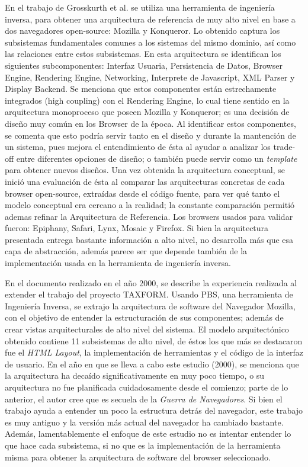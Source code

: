 En el trabajo de Grosskurth et al. \cite{2005-grosskurth-browser-refarch, preprint-grosskurth-browser-archevol} se utiliza una herramienta de ingeniería inversa, para obtener una arquitectura de referencia de muy alto nivel en base a dos navegadores open-source: Mozilla y Konqueror. Lo obtenido captura los subsistemas fundamentales comunes a los sistemas del mismo dominio, así como las relaciones entre estos subsistemas. En esta arquitectura se identifican los siguientes subcomponentes: Interfaz Usuaria, Persistencia de Datos, Browser Engine, Rendering Engine, Networking, Interprete de Javascript, XML Parser y Display Backend. Se menciona que estos componentes están estrechamente integrados (high coupling) con el Rendering Engine, lo cual tiene sentido en la arquitectura monoproceso que poseen Mozilla y Konqueror; es una decisión de diseño muy común en los Browser de la época. Al identificar estos componentes, se comenta que esto podría servir tanto en el diseño y durante la mantención de un sistema, pues mejora el entendimiento de ésta al ayudar a analizar los trade-off entre diferentes opciones de diseño; o también puede servir como un \textit{template} para obtener nuevos diseños. Una vez obtenida la arquitectura conceptual, se inició una evaluación de ésta al comparar las arquitecturas concretas de cada browser open-source, extraídas desde el código fuente, para ver qué tanto el modelo conceptual era cercano a la realidad; la constante comparación permitió ademas refinar la Arquitectura de Referencia. Los browsers usados para validar fueron: Epiphany, Safari, Lynx, Mosaic y Firefox. Si bien la arquitectura presentada entrega bastante información a alto nivel, no desarrolla más que esa capa de abstracción, además parece ser que depende también de la implementación usada en la herramienta de ingeniería inversa. 


En el documento \cite{Godfrey2000} realizado en el año 2000, se describe la experiencia realizada al extender el trabajo del proyecto TAXFORM. Usando PBS, una herramienta de Ingeniería Inversa, se extrajo la arquitectura de software del Navegador Mozilla, con el objetivo de entender la estructuración de sus componentes; además de crear vistas arquitecturales de alto nivel del sistema. El modelo arquitectónico obtenido contiene 11 subsistemas de alto nivel, de éstos los que más se destacaron fue el \textit{HTML Layout}, la implementación de herramientas y el código de la interfaz de usuario. En el año en que se lleva a cabo este estudio (2000), se menciona que la arquitectura ha decaído significativamente en muy poco tiempo, o su arquitectura no fue planificada cuidadosamente desde el comienzo; parte de lo anterior, el autor cree que es secuela de la \textit{Guerra de Navegadores}. Si bien el trabajo ayuda a entender un poco la estructura detrás del navegador, este trabajo es muy antiguo y la versión más actual del navegador ha cambiado bastante. Además, lamentablemente el enfoque de este estudio no es intentar entender lo que hace cada subsistema, si no que es la implementación de la herramienta misma para obtener la arquitectura de software del browser seleccionado.

